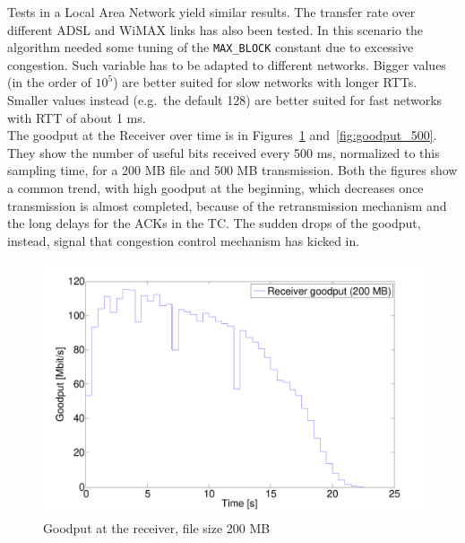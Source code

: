 \documentclass[10pt,twocolumn]{article}
\begin{document}
Tests in a Local Area Network yield similar results. The transfer rate over different ADSL and WiMAX links has also been tested. In this scenario the algorithm needed some tuning of the \texttt{MAX\_BLOCK}
constant due to excessive congestion. Such variable has to be adapted to
different networks. Bigger values (in the order of $10^5$) are better suited
for slow networks with longer RTTs. Smaller values instead (e.g.\ the default
128) are better suited for fast networks with RTT of about 1 ms. \\
The goodput at the Receiver over time is in Figures~\ref{fig:goodput_200} and~\ref{fig:goodput_500}. They show the number of useful bits received every 500 ms, normalized to this sampling time, for a 200 MB file and 500 MB transmission. Both the figures show a common trend, with high goodput at the beginning, which decreases once transmission is almost completed, because of the retransmission mechanism and the long delays for the ACKs in the TC. The sudden drops of the goodput, instead, signal that congestion control mechanism has kicked in.\\

\begin{figure}[h]
  \centering
  \includegraphics[width = 0.95\columnwidth, keepaspectratio]{tex/images/goodput_c2_200.pdf}
  \caption{Goodput at the receiver, file size 200 MB}
  \label{fig:goodput_200}
\end{figure}
\end{document}
